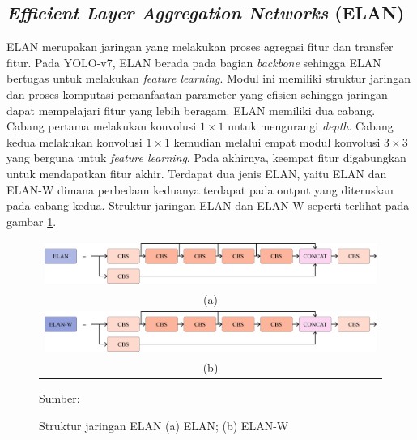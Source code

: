     \subsection{\textit{Efficient Layer Aggregation Networks} (ELAN)}
    ELAN merupakan jaringan yang melakukan proses agregasi fitur dan transfer fitur. Pada YOLO-v7, ELAN berada pada bagian \textit{backbone} sehingga ELAN bertugas untuk melakukan \textit{feature learning}. Modul ini memiliki struktur jaringan dan proses komputasi pemanfaatan parameter yang efisien sehingga jaringan dapat mempelajari fitur yang lebih beragam. ELAN memiliki dua cabang. Cabang pertama melakukan konvolusi $1\times 1$ untuk mengurangi \textit{depth}. Cabang kedua melakukan konvolusi $1\times 1$ kemudian melalui empat modul konvolusi $3\times 3$ yang berguna untuk \textit{feature learning}. Pada akhirnya, keempat fitur digabungkan untuk mendapatkan fitur akhir. Terdapat dua jenis ELAN, yaitu ELAN dan ELAN-W dimana perbedaan keduanya terdapat pada output yang diteruskan pada cabang kedua. Struktur jaringan ELAN dan ELAN-W seperti terlihat pada gambar \ref{fig:elan}.
    
    \begin{figure}[H]
        \centering
        \begin{tabular}{c}
            \includegraphics[width=13cm]{../img/ELAN.png}\\
            (a)\\
            \includegraphics[width=13cm]{../img/ELAN-W.png}\\
            (b)\\
        \end{tabular}
        \caption{Struktur jaringan ELAN (a) ELAN; (b) ELAN-W}
        \label{fig:elan}
        Sumber: \citep{Wang2022}
    \end{figure}


